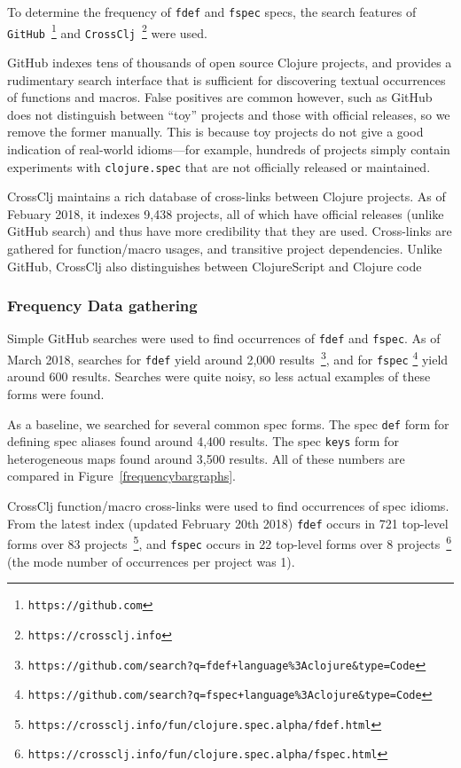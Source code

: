 To determine the frequency of \texttt{fdef} and \texttt{fspec} specs,
the search features of \texttt{GitHub}~\footnote{\texttt{https://github.com}} and 
\texttt{CrossClj}~\footnote{\texttt{https://crossclj.info}} were used.

GitHub indexes tens of thousands of open source Clojure projects, and provides
a rudimentary search interface that is sufficient for discovering textual occurrences 
of functions and macros. False positives are common however, such as
GitHub does not distinguish
between ``toy'' projects and those with official releases, so we remove the former manually.
This is because toy projects do not give a good indication of real-world idioms---for example,
hundreds of projects simply contain experiments with \texttt{clojure.spec} that
are not officially released or maintained.

CrossClj maintains a rich database of cross-links between Clojure projects.
As of Febuary 2018, it indexes 9,438 projects, all of which have official releases (unlike
GitHub search) and thus have more credibility that they are used.
Cross-links are gathered for function/macro usages, and transitive project dependencies.
Unlike GitHub, CrossClj also distinguishes between ClojureScript and Clojure code

\subsubsection{Frequency Data gathering}

Simple GitHub searches were used to find occurrences of \texttt{fdef} and \texttt{fspec}.
As of March 2018,
searches for \texttt{fdef}
yield around 2,000 results~\footnote{\texttt{https://github.com/search?q=fdef+language\%3Aclojure\&type=Code}},
and for \texttt{fspec} 
\footnote{\texttt{https://github.com/search?q=fspec+language\%3Aclojure\&type=Code}}
yield around 600 results.
Searches were quite noisy, so less actual examples of these forms were found.

As a baseline, we searched for several common spec forms.
The spec \texttt{def} form for defining spec aliases found around 4,400 results.
The spec \texttt{keys} form for heterogeneous maps found around 3,500 results.
All of these numbers are compared in Figure~\ref{frequencybargraphs}.

CrossClj function/macro cross-links were used to find occurrences of spec idioms.
From the latest index (updated February 20th 2018)
\texttt{fdef} occurs in 721 top-level forms over 83 
projects~\footnote{\texttt{https://crossclj.info/fun/clojure.spec.alpha/fdef.html}}, and
\texttt{fspec} occurs in 22 top-level forms over 8 
projects~\footnote{\texttt{https://crossclj.info/fun/clojure.spec.alpha/fspec.html}}
(the mode number of occurrences per project was 1).

